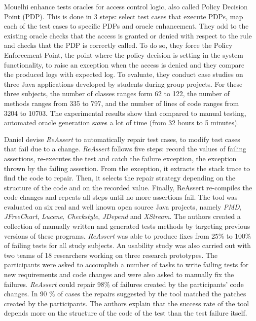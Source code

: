 Mouelhi \etal\cite{Mouelhi:2009} enhance tests oracles for access control logic, also called Policy Decision Point (PDP).
This is done in 3 steps: 
select test cases that execute PDPs, map each of the test cases to specific PDPs and  oracle enhancement. 
They add to the existing oracle checks that the access is granted or denied with respect to the rule and checks that the PDP is correctly called. 
To do so, they force the Policy Enforcement Point, \ie the point where the policy decision is setting in the system functionality, to raise an exception when the access is denied and they compare the produced logs with expected log. 
To evaluate, they conduct case studies on three Java applications developed by students during group projects. 
For these three subjects, the number of classes ranges form 62 to 122, the number of methods ranges from 335 to 797, and the number of lines of code ranges from 3204 to 10703. 
The experimental results show that compared to manual testing, automated oracle generation saves a lot of time (from 32 hours to 5 minutes).

Daniel \etal\cite{reassert2009} devise \emph{ReAssert} to  automatically repair test cases, \ie to modify test cases that fail due to a change.
\emph{ReAssert} follows five steps: 
record the values of failing assertions, 
re-executes the test and catch the failure exception, \ie the exception thrown by the failing assertion. 
From the exception, it extracts the stack trace to find the code to repair. 
Then, it selects the repair strategy depending on the structure of the code and on the recorded value. 
Finally, ReAssert re-compiles the code changes and repeats all steps until no more assertions fail. 
The tool was evaluated on six real and well known open source Java projects, namely \emph{PMD}, \emph{JFreeChart}, \emph{Lucene}, \emph{Checkstyle}, \emph{JDepend} and \emph{XStream}. 
The authors created a collection of manually written and generated tests methods by targeting previous versions of these programs. 
\emph{ReAssert} was able to produce fixes from 25\% to 100\% of failing tests for all study subjects. 
An usability study was also carried out with two teams of 18 researchers working on three research prototypes. 
The participants were asked to accomplish a number of tasks to write failing tests for new requirements and code changes and were also asked to manually fix the failures. 
\emph{ReAssert} could repair 98\% of failures created by the participants’ code changes. 
In 90 \% of cases the repairs suggested by the tool  matched the patches created by the participants. 
The authors explain that the success rate of the tool depends more on the structure of the code of the test than the test failure itself.


